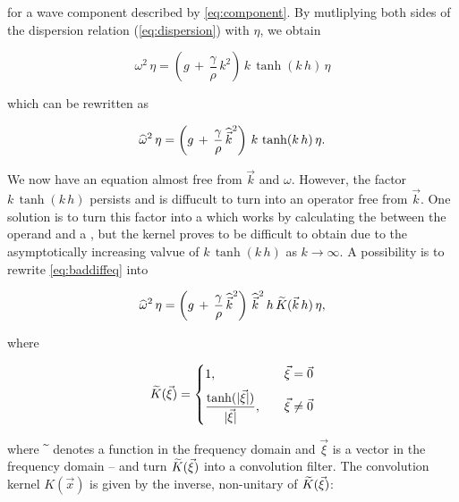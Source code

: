for a wave component described by \eqref{eq:component}. By mutliplying both sides of the dispersion relation (\eqref{eq:dispersion}) with $\eta$, we obtain

\begin{equation}
\omega^2\,\eta = \left(g\,+\,\frac{\gamma}{\rho}\,k^2\right)\,k\,\tanh(k\,h)\,\eta
\end{equation}

which can be rewritten as

\begin{equation} \label{eq:baddiffeq}
\widehat{\omega}^2\,\eta = \left(g\,+\,\frac{\gamma}{\rho}\,{\widehat{\vec{k}}}^2\right)\,k\,\tanh(k\,h)\,\eta.
\end{equation}

We now have an equation almost free from $\vec{k}$ and $\omega$. However, the factor $k\,\tanh(k\,h)$ persists and is diffucult to turn into an operator free from $\vec{k}$. One solution is to turn this factor into a  which works by calculating the  between the operand and a , but the kernel proves to be difficult to obtain due to the asymptotically increasing valvue of $k\,\tanh(k\,h)$ as $k\rightarrow\infty$. A possibility is to rewrite \eqref{eq:baddiffeq} into

\begin{equation} \label{eq:betterdiffeq}
\widehat{\omega}^2\,\eta = \left(g\,+\,\frac{\gamma}{\rho}\,{\widehat{\vec{k}}}^2\right)\,{\widehat{\vec{k}}}^2\,h\,\widetilde{K}(\vec{k}\,h)\,\eta,
\end{equation}

where

\begin{equation} \label{eq:transkernelofxivec}
\widetilde{K}(\vec{\xi}) = \begin{cases}
1                                                  , & \quad \vec{\xi} = \vec{0} \\[.5em]
\displaystyle\frac{\tanh(|\vec{\xi}|)}{|\vec{\xi}|}, & \quad \vec{\xi} \neq \vec{0}
\end{cases}
\end{equation}

where $\widetilde{~}$ denotes a function in the frequency domain and $\vec{\xi}$ is a  vector in the frequency domain -- and turn $\widetilde{K}(\vec{\xi})$ into a convolution filter. The convolution kernel $K(\vec{x})$ is given by the inverse, non-unitary  of $\widetilde{K}(\vec{\xi})$:

